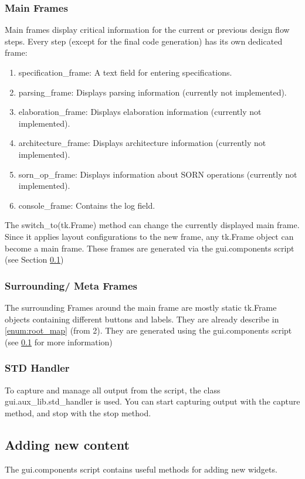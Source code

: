 \documentclass{article}
\begin{document}
\subsubsection{Main Frames}
\label{ter:main_frames}
Main frames display critical information for the current or previous design flow steps. Every step (except for the final code generation) has its own dedicated frame:
\begin{enumerate}
    \item specification\_frame: A text field for entering specifications.
    \item parsing\_frame: Displays parsing information (currently not implemented).
    \item elaboration\_frame: Displays elaboration information (currently not implemented).
    \item architecture\_frame: Displays architecture information (currently not implemented).
    \item sorn\_op\_frame: Displays information about SORN operations (currently not implemented).
    \item console\_frame: Contains the log field.
\end{enumerate}

The switch\_to(tk.Frame) method can change the currently displayed main frame. Since it applies layout configurations to the new frame, any tk.Frame object can become a main frame. These frames are generated via the gui.components script (see Section \ref{ter:new_content})

\subsubsection{Surrounding/ Meta Frames}
The surrounding Frames around the main frame are mostly static tk.Frame objects containing different buttons and labels. They are already describe in \ref{enum:root_map} (from 2).
They are generated using the gui.components script (see \ref{ter:new_content} for more information)

\subsubsection{STD Handler}
To capture and manage all output from the script, the class gui.aux\_lib.std\_handler is used. You can start capturing output with the capture method, and stop with the stop method.

\subsection{Adding new content}
\label{ter:new_content}
The gui.components script contains useful methods for adding new widgets.
\end{document}
